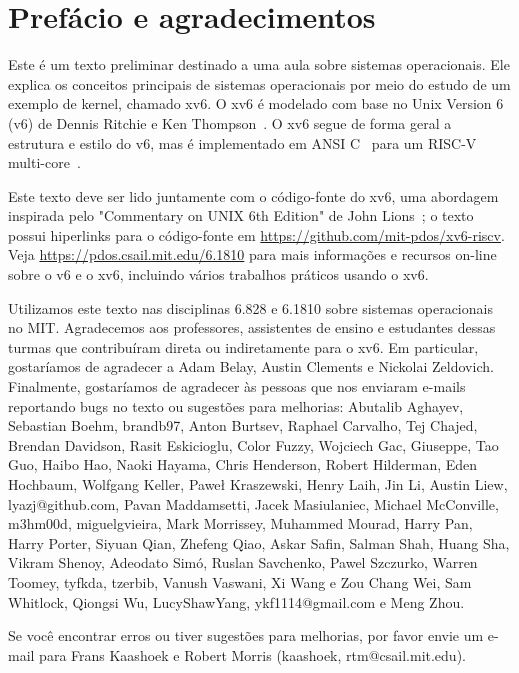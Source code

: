 \chapter*{Prefácio e agradecimentos}

Este é um texto preliminar destinado a uma aula sobre sistemas operacionais. Ele
explica os conceitos principais de sistemas operacionais por meio do estudo de um exemplo
de kernel, chamado xv6. O xv6 é modelado com base no Unix Version 6 (v6) de Dennis Ritchie e
Ken Thompson~\cite{unix}. O xv6 segue de forma geral a estrutura
e estilo do v6, mas é implementado em ANSI C~\cite{kernighan} para
um RISC-V multi-core~\cite{riscv}.

Este texto deve ser lido juntamente com o código-fonte do xv6, uma
abordagem inspirada pelo "Commentary on UNIX 6th Edition" de John Lions~\cite{lions};
o texto possui hiperlinks para o código-fonte em
\url{https://github.com/mit-pdos/xv6-riscv}. Veja
\url{https://pdos.csail.mit.edu/6.1810} para mais informações e
recursos on-line sobre o v6 e o xv6, incluindo vários trabalhos práticos
usando o xv6.

Utilizamos este texto nas disciplinas 6.828 e 6.1810 sobre sistemas operacionais no MIT.
Agradecemos aos professores, assistentes de ensino e
estudantes dessas turmas que contribuíram direta ou indiretamente
para o xv6. Em particular, gostaríamos de agradecer a Adam Belay,
Austin Clements e Nickolai Zeldovich. Finalmente, gostaríamos de
agradecer às pessoas que nos enviaram e-mails reportando bugs no texto ou sugestões para
melhorias: Abutalib Aghayev, Sebastian Boehm, brandb97, Anton
Burtsev, Raphael Carvalho, Tej Chajed, Brendan Davidson, Rasit
Eskicioglu, Color Fuzzy, Wojciech Gac, Giuseppe, Tao Guo, Haibo Hao,
Naoki Hayama, Chris Henderson, Robert Hilderman, Eden Hochbaum,
Wolfgang Keller, Paweł Kraszewski, Henry Laih, Jin Li, Austin Liew,
lyazj@github.com, Pavan Maddamsetti, Jacek Masiulaniec, Michael
McConville, m3hm00d, miguelgvieira, Mark Morrissey, Muhammed Mourad,
Harry Pan, Harry Porter, Siyuan Qian, Zhefeng Qiao, Askar Safin,
Salman Shah, Huang Sha, Vikram Shenoy, Adeodato Simó, Ruslan
Savchenko, Pawel Szczurko, Warren Toomey, tyfkda, tzerbib, Vanush
Vaswani, Xi Wang e Zou Chang Wei, Sam Whitlock, Qiongsi Wu,
LucyShawYang, ykf1114@gmail.com e Meng Zhou.

Se você encontrar erros ou tiver sugestões para melhorias, por favor envie um e-mail para
Frans Kaashoek e Robert Morris (kaashoek, rtm@csail.mit.edu).